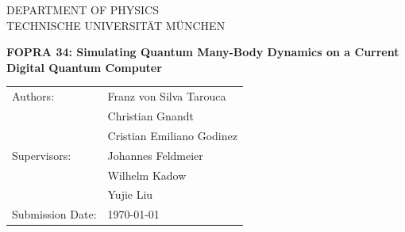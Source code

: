 
\newcommand{\getTitle}{FOPRA 34: Simulating Quantum Many-Body Dynamics on a Current Digital Quantum Computer}
\newcommand{\getAuthor}{Franz von Silva Tarouca}
\newcommand{\getAuthorI}{Christian Gnandt}
\newcommand{\getAuthorII}{Cristian Emiliano Godinez}

\newcommand{\getSupervisor}{Johannes Feldmeier}
\newcommand{\getSupervisorI}{Wilhelm Kadow}
\newcommand{\getSupervisorII}{Yujie Liu}


\begin{titlepage}
    \centering


    \vspace{5mm}
    {\huge\MakeUppercase{Department of Physics}}\\

    \vspace{5mm}
    {\large\MakeUppercase{Technische Universität München}}\\

    \vspace{20mm}

    \vspace{15mm}
    {\huge\bfseries \getTitle{}}

    \vspace{20mm}
    \begin{tabular}{l l}
        Authors:          & \getAuthor{} \\
                          & \getAuthorI{} \\
                          & \getAuthorII{} \\
        Supervisors:      & \getSupervisor{} \\
                          & \getSupervisorI{} \\
                          & \getSupervisorII{} \\
        Submission Date: & \today{} \\
    \end{tabular}

\end{titlepage}